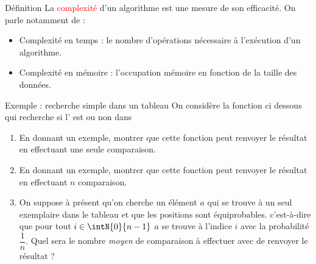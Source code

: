 \documentclass[10pt]{beamer}
\begin{document}
\begin{frame}[fragile]{\Ctitle}{\stitle}
	\begin{alertblock}{Définition}
		La \textcolor{red}{complexité} d'un algorithme est une mesure de son efficacité.
		\onslide<2-> On parle notamment de :
		\begin{itemize}
			\item<3-> Complexité en temps : le nombre d'opérations nécessaire à l'exécution d'un algorithme.
			\item<4-> Complexité en mémoire : l'occupation mémoire en fonction de la taille des données.
		\end{itemize}
	\end{alertblock}
\end{frame}


\begin{frame}[fragile]{\Ctitle}{\stitle}
	\begin{exampleblock}{Exemple : recherche simple dans un tableau}
		{\small On considère la fonction ci dessous qui recherche si l' est ou non dans {}}
		\begin{enumerate}
			\item<3-> {\small En donnant un exemple, montrer que cette fonction peut renvoyer le résultat en effectuant une seule comparaison.}
			\item<4-> {\small En donnant un exemple, montrer que cette fonction peut renvoyer le résultat en effectuant $n$ comparaison.}
			\item<5-> {\small On suppose à présent qu'on cherche un élément $a$ qui se trouve à un seul exemplaire dans le tableau et que les positions sont équiprobables. c'est-à-dire que pour tout $i \in \intN{0}{n-1}$ $a$ se trouve à l'indice $i$ avec la probabilité $\dfrac{1}{n}$. Quel sera le nombre \textit{moyen} de comparaison à effectuer avec de renvoyer le résultat ?}
		\end{enumerate}
	\end{exampleblock}
\end{frame}
\end{document}
